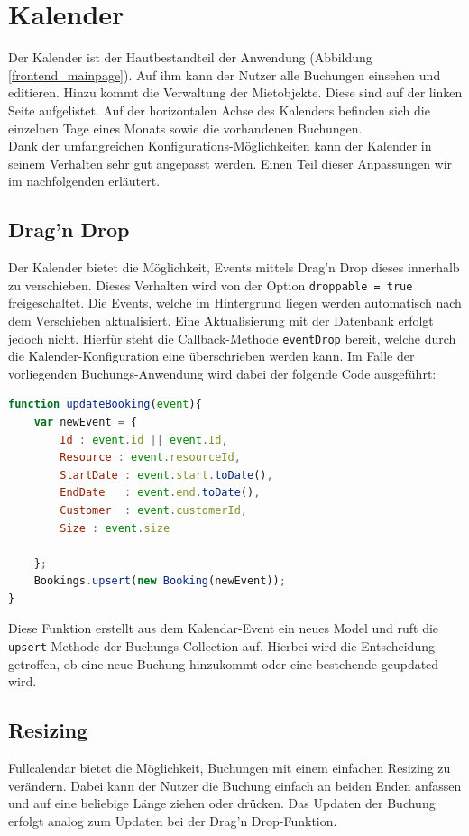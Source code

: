 \section{Kalender}
Der Kalender ist der Hautbestandteil der Anwendung (Abbildung \ref{frontend_mainpage}). Auf ihm kann der Nutzer alle Buchungen einsehen und editieren.
Hinzu kommt die Verwaltung der Mietobjekte. Diese sind auf der linken Seite aufgelistet. Auf der horizontalen Achse des Kalenders befinden sich die einzelnen Tage eines Monats sowie die vorhandenen Buchungen.\\
Dank der umfangreichen Konfigurations-Möglichkeiten kann der Kalender in seinem Verhalten sehr gut angepasst werden.
Einen Teil dieser Anpassungen wir im nachfolgenden erläutert.

\subsection{Drag'n Drop}
Der Kalender bietet die Möglichkeit, Events mittels Drag'n Drop dieses innerhalb zu verschieben. Dieses Verhalten wird von der Option \texttt{droppable = true} freigeschaltet.
Die Events, welche im Hintergrund liegen werden automatisch nach dem Verschieben aktualisiert.
Eine Aktualisierung mit der Datenbank erfolgt jedoch nicht. Hierfür steht die Callback-Methode \texttt{eventDrop} bereit, welche durch die Kalender-Konfiguration eine überschrieben werden kann. Im Falle der vorliegenden Buchungs-Anwendung wird dabei der folgende Code ausgeführt:

 \begin{lstlisting}[language=Javascript, label=code_exampleUpdateBooking, caption=Aktualisierungscode nach einem Drag n Drop-Event]
function updateBooking(event){
    var newEvent = {
        Id : event.id || event.Id,
        Resource : event.resourceId,
        StartDate : event.start.toDate(),
        EndDate   : event.end.toDate(),
        Customer  : event.customerId,
        Size : event.size

    };
    Bookings.upsert(new Booking(newEvent));
}
 \end{lstlisting}

 Diese Funktion erstellt aus dem Kalendar-Event ein neues Model und ruft die \texttt{upsert}-Methode der Buchungs-Collection auf.
 Hierbei wird die Entscheidung getroffen, ob eine neue Buchung hinzukommt oder eine bestehende geupdated wird.

 \subsection{Resizing}
 Fullcalendar bietet die Möglichkeit, Buchungen mit einem einfachen Resizing zu verändern. Dabei kann der Nutzer die Buchung einfach an beiden Enden anfassen und auf eine beliebige Länge ziehen oder drücken. Das Updaten der Buchung erfolgt analog zum Updaten bei der Drag'n Drop-Funktion.


